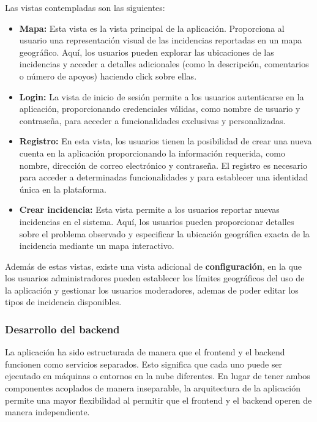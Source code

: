 \documentclass{article}
\begin{document}
Las vistas contempladas son las siguientes:

\begin{itemize}
    \item \textbf{Mapa:} Esta vista es la vista principal de la aplicación. Proporciona al usuario una representación visual de las incidencias reportadas en un mapa geográfico. Aquí, los usuarios pueden explorar las ubicaciones de las incidencias y acceder a detalles adicionales (como la descripción, comentarios o número de apoyos) haciendo click sobre ellas. 
    \item \textbf{Login:} La vista de inicio de sesión permite a los usuarios autenticarse en la aplicación, proporcionando credenciales válidas, como nombre de usuario y contraseña, para acceder a funcionalidades exclusivas y personalizadas.
    \item \textbf{Registro:} En esta vista, los usuarios tienen la posibilidad de crear una nueva cuenta en la aplicación proporcionando la información requerida, como nombre, dirección de correo electrónico y contraseña. El registro es necesario para acceder a determinadas funcionalidades y para establecer una identidad única en la plataforma.
    \item \textbf{Crear incidencia:} Esta vista permite a los usuarios reportar nuevas incidencias en el sistema. Aquí, los usuarios pueden proporcionar detalles sobre el problema observado y especificar la ubicación geográfica exacta de la incidencia mediante un mapa interactivo.
\end{itemize}

Además de estas vistas, existe una vista adicional de \textbf{configuración}, en la que los usuarios administradores pueden establecer los límites geográficos del uso de la aplicación y gestionar los usuarios moderadores, ademas de poder editar los tipos de incidencia disponibles.

\subsubsection{Desarrollo del backend}

La aplicación ha sido estructurada de manera que el frontend y el backend funcionen como servicios separados. Esto significa que cada uno puede ser ejecutado en máquinas o entornos en la nube diferentes. En lugar de tener ambos componentes acoplados de manera inseparable, la arquitectura de la aplicación permite una mayor flexibilidad al permitir que el frontend y el backend operen de manera independiente.
\end{document}
